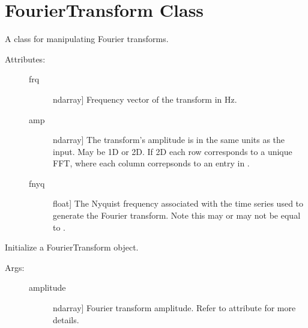 \documentclass[letterpaper,10pt,english]{sphinxmanual}
\begin{document}
\chapter{FourierTransform Class}
\label{\detokenize{index:fouriertransform-class}}

\begin{fulllineitems}
\label{\detokenize{index:sigpropy.FourierTransform}}
A class for manipulating Fourier transforms.
\begin{description}
\item[{Attributes:}] \leavevmode\begin{description}
\item[{frq}] \leavevmode{[}ndarray{]}
Frequency vector of the transform in Hz.

\item[{amp}] \leavevmode{[}ndarray{]}
The transform’s amplitude is in the same units as the input.
May be 1D or 2D. If 2D each row corresponds to a unique FFT,
where each column correpsonds to an entry in .

\item[{fnyq}] \leavevmode{[}float{]}
The Nyquist frequency associated with the time series used
to generate the Fourier transform. Note this may or may not
be equal to .

\end{description}

\end{description}

\begin{fulllineitems}
\label{\detokenize{index:sigpropy.FourierTransform.__init__}}
Initialize a FourierTransform object.
\begin{description}
\item[{Args:}] \leavevmode\begin{description}
\item[{amplitude}] \leavevmode{[}ndarray{]}
Fourier transform amplitude. Refer to attribute 
for more details.


\end{description}
\end{description}
\end{fulllineitems}
\end{fulllineitems}
\end{document}
